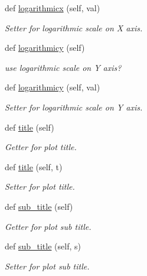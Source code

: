 \begin{DoxyCompactItemize}
def \mbox{\hyperlink{classbridges_1_1line__chart_1_1_line_chart_a6feef7582874fb2338ff7fa7a469db5d}{logarithmicx}} (self, val)
\begin{DoxyCompactList}\small\item\em Setter for logarithmic scale on X axis. \end{DoxyCompactList}\item 
def \mbox{\hyperlink{classbridges_1_1line__chart_1_1_line_chart_a7ddc26feab771e7b36e9040ee38fab7f}{logarithmicy}} (self)
\begin{DoxyCompactList}\small\item\em use logarithmic scale on Y axis? \end{DoxyCompactList}\item 
def \mbox{\hyperlink{classbridges_1_1line__chart_1_1_line_chart_ac29eaedd760a3f608f7b11193befa1c5}{logarithmicy}} (self, val)
\begin{DoxyCompactList}\small\item\em Setter for logarithmic scale on Y axis. \end{DoxyCompactList}\item 
def \mbox{\hyperlink{classbridges_1_1line__chart_1_1_line_chart_ae9a4a1643095d0d0ac4d98e15adbeb3f}{title}} (self)
\begin{DoxyCompactList}\small\item\em Getter for plot title. \end{DoxyCompactList}\item 
def \mbox{\hyperlink{classbridges_1_1line__chart_1_1_line_chart_adbee0286b07ee001e0c762aa9c147946}{title}} (self, t)
\begin{DoxyCompactList}\small\item\em Setter for plot title. \end{DoxyCompactList}\item 
def \mbox{\hyperlink{classbridges_1_1line__chart_1_1_line_chart_a3361674c961f45bfa058cff38ba49bd8}{sub\+\_\+title}} (self)
\begin{DoxyCompactList}\small\item\em Getter for plot sub title. \end{DoxyCompactList}\item 
def \mbox{\hyperlink{classbridges_1_1line__chart_1_1_line_chart_ac26e0a4de0438a5463ba5dca95d2b0a3}{sub\+\_\+title}} (self, s)
\begin{DoxyCompactList}\small\item\em Setter for plot sub title. \end{DoxyCompactList}\item 

\end{DoxyCompactItemize}
